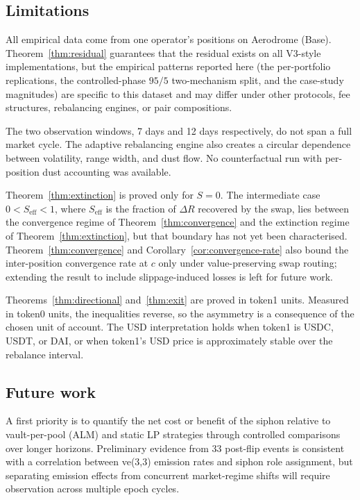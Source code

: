 \documentclass{manuscript}
\begin{document}
\subsection{Limitations}\label{sec:limitations}

All empirical data come from one operator's positions on Aerodrome (Base). Theorem~\ref{thm:residual} guarantees that the residual exists on all V3-style implementations, but the empirical patterns reported here (the per-portfolio replications, the controlled-phase $95/5$ two-mechanism split, and the case-study magnitudes) are specific to this dataset and may differ under other protocols, fee structures, rebalancing engines, or pair compositions.

The two observation windows, 7 days and 12 days respectively, do not span a full market cycle. The adaptive rebalancing engine also creates a circular dependence between volatility, range width, and dust flow. No counterfactual run with per-position dust accounting was available.

Theorem~\ref{thm:extinction} is proved only for $S = 0$. The intermediate case $0 < S_{\text{eff}} < 1$, where $S_{\text{eff}}$ is the fraction of $\Delta R$ recovered by the swap, lies between the convergence regime of Theorem~\ref{thm:convergence} and the extinction regime of Theorem~\ref{thm:extinction}, but that boundary has not yet been characterised. Theorem~\ref{thm:convergence} and Corollary~\ref{cor:convergence-rate} also bound the inter-position convergence rate at $c$ only under value-preserving swap routing; extending the result to include slippage-induced losses is left for future work.

Theorems~\ref{thm:directional} and~\ref{thm:exit} are proved in token1 units. Measured in token0 units, the inequalities reverse, so the asymmetry is a consequence of the chosen unit of account. The USD interpretation holds when token1 is USDC, USDT, or DAI, or when token1's USD price is approximately stable over the rebalance interval.

\subsection{Future work}\label{sec:future}

A first priority is to quantify the net cost or benefit of the siphon relative to vault-per-pool (ALM) and static LP strategies through controlled comparisons over longer horizons. Preliminary evidence from 33 post-flip events is consistent with a correlation between ve(3,3) emission rates and siphon role assignment, but separating emission effects from concurrent market-regime shifts will require observation across multiple epoch cycles.
\end{document}
